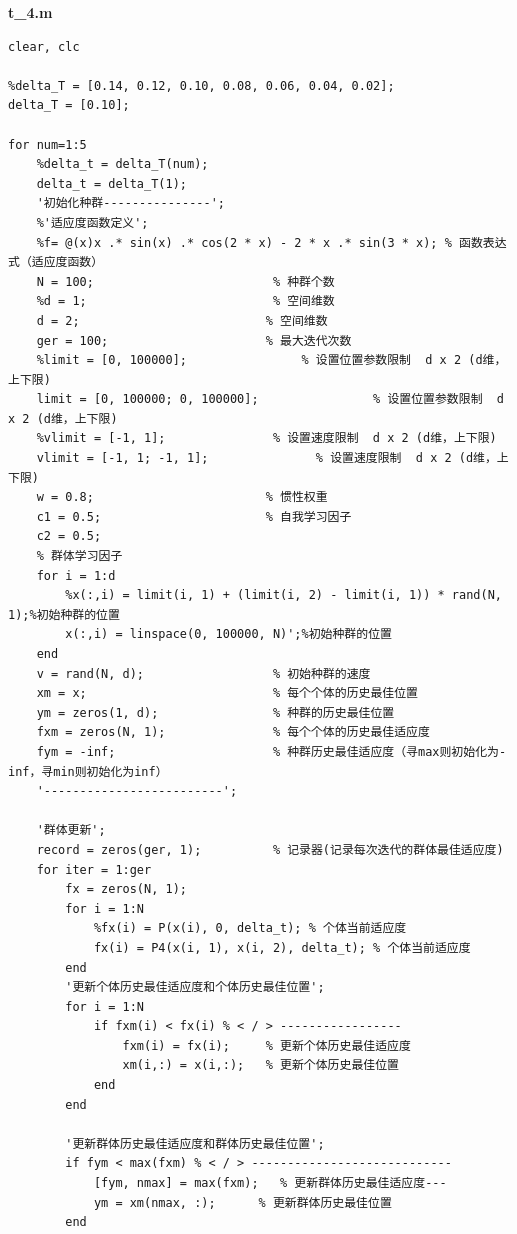 \documentclass{my_paper}
\begin{document}
\noindent\textbf{t\_4.m}
\begin{lstlisting}
clear, clc

%delta_T = [0.14, 0.12, 0.10, 0.08, 0.06, 0.04, 0.02];
delta_T = [0.10];

for num=1:5
    %delta_t = delta_T(num);
    delta_t = delta_T(1);
    '初始化种群---------------';
    %'适应度函数定义';
    %f= @(x)x .* sin(x) .* cos(2 * x) - 2 * x .* sin(3 * x); % 函数表达式（适应度函数）
    N = 100;                         % 种群个数
    %d = 1;                          % 空间维数
    d = 2;                          % 空间维数
    ger = 100;                      % 最大迭代次数
    %limit = [0, 100000];                % 设置位置参数限制  d x 2 (d维，上下限)
    limit = [0, 100000; 0, 100000];                % 设置位置参数限制  d x 2 (d维，上下限)
    %vlimit = [-1, 1];               % 设置速度限制  d x 2 (d维，上下限)
    vlimit = [-1, 1; -1, 1];               % 设置速度限制  d x 2 (d维，上下限)
    w = 0.8;                        % 惯性权重
    c1 = 0.5;                       % 自我学习因子
    c2 = 0.5;
    % 群体学习因子
    for i = 1:d
        %x(:,i) = limit(i, 1) + (limit(i, 2) - limit(i, 1)) * rand(N, 1);%初始种群的位置
        x(:,i) = linspace(0, 100000, N)';%初始种群的位置
    end
    v = rand(N, d);                  % 初始种群的速度
    xm = x;                          % 每个个体的历史最佳位置
    ym = zeros(1, d);                % 种群的历史最佳位置
    fxm = zeros(N, 1);               % 每个个体的历史最佳适应度
    fym = -inf;                      % 种群历史最佳适应度（寻max则初始化为-inf，寻min则初始化为inf）
    '-------------------------';

    '群体更新';
    record = zeros(ger, 1);          % 记录器(记录每次迭代的群体最佳适应度)
    for iter = 1:ger
        fx = zeros(N, 1);
        for i = 1:N
            %fx(i) = P(x(i), 0, delta_t); % 个体当前适应度
            fx(i) = P4(x(i, 1), x(i, 2), delta_t); % 个体当前适应度
        end
        '更新个体历史最佳适应度和个体历史最佳位置';
        for i = 1:N      
            if fxm(i) < fx(i) % < / > -----------------
                fxm(i) = fx(i);     % 更新个体历史最佳适应度
                xm(i,:) = x(i,:);   % 更新个体历史最佳位置
            end 
        end

        '更新群体历史最佳适应度和群体历史最佳位置';
        if fym < max(fxm) % < / > ----------------------------
            [fym, nmax] = max(fxm);   % 更新群体历史最佳适应度---
            ym = xm(nmax, :);      % 更新群体历史最佳位置
        end


\end{lstlisting}
\end{document}
